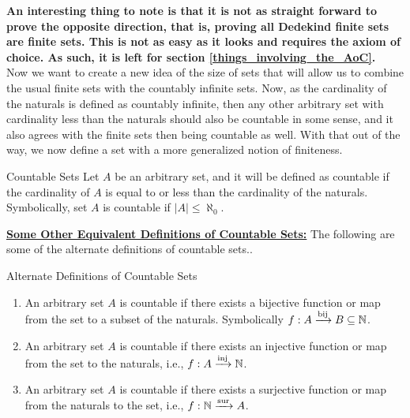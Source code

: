 \noindent \textbf{An interesting thing to note is that it is not as straight forward to prove the opposite direction, that is, proving all Dedekind finite sets are finite sets. This is not as easy as it looks and requires the axiom of choice. As such, it is left for section \eqref{things_involving_the_AoC}.}\\ Now we want to create a new idea of the size of sets that will allow us to combine the usual finite sets with the countably infinite sets. Now, as the cardinality of the naturals is defined as countably infinite, then any other arbitrary set with cardinality less than the naturals should also be countable in some sense, and it also agrees with the finite sets then being countable as well. With that out of the way, we now define a set with a more generalized notion of finiteness.
\begin{Definition}{Countable Sets}\label{countable_sets}
    Let $A$ be an arbitrary set, and it will be defined as countable if the cardinality of $A$ is equal to or less than the cardinality of the naturals. Symbolically, set $A$ is countable if $|A|\leq\aleph_0$.
\end{Definition}
\noindent \underline{\textbf{Some Other Equivalent Definitions of Countable Sets:}} The following are some of the alternate definitions of countable sets..
\begin{Definition}{Alternate Definitions of Countable Sets}\label{alternate_countable_set}
    \begin{enumerate}
        \item An arbitrary set $A$ is countable if there exists a bijective function or map from the set to a subset of the naturals. Symbolically $f:A\xrightarrow{\rm bij}B\subseteq\mathbb{N}$.
        \item An arbitrary set $A$ is countable if there exists an injective function or map from the set to the naturals, i.e., $f:A\xrightarrow{\rm inj}\mathbb{N}$.
        \item An arbitrary set $A$ is countable if there exists a surjective function or map from the naturals to the set, i.e., $f:\mathbb{N}\xrightarrow{\rm sur}A$.
\end{enumerate}
\end{Definition}
